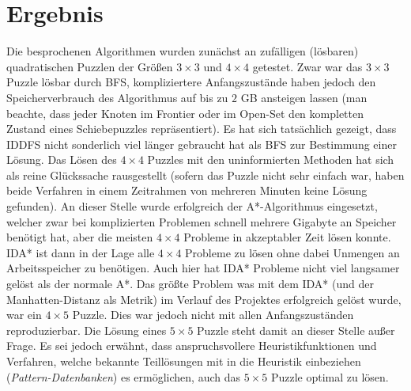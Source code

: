 \documentclass{whswinvcbook}
\begin{document}
\section{Ergebnis}
Die besprochenen Algorithmen wurden zunächst an zufälligen (lösbaren) quadratischen Puzzlen der Größen $3\times3$ und $4\times4$ getestet. Zwar war das $3\times3$ Puzzle lösbar durch BFS, kompliziertere Anfangszustände haben jedoch den Speicherverbrauch des Algorithmus auf bis zu $2$ GB ansteigen lassen (man beachte, dass jeder Knoten im Frontier oder im Open-Set den kompletten Zustand eines Schiebepuzzles repräsentiert). Es hat sich tatsächlich gezeigt, dass IDDFS nicht sonderlich viel länger gebraucht hat als BFS zur Bestimmung einer Lösung. Das Lösen des $4\times4$ Puzzles mit den uninformierten Methoden hat sich als reine Glückssache rausgestellt (sofern das Puzzle nicht sehr einfach war, haben beide Verfahren in einem Zeitrahmen von mehreren Minuten keine Lösung gefunden). An dieser Stelle wurde erfolgreich der A*-Algorithmus eingesetzt, welcher zwar bei komplizierten Problemen schnell mehrere Gigabyte an Speicher benötigt hat, aber die meisten $4\times4$ Probleme in akzeptabler Zeit lösen konnte. IDA* ist dann in der Lage alle $4\times4$ Probleme zu lösen ohne dabei Unmengen an Arbeitsspeicher zu benötigen. Auch hier hat IDA* Probleme nicht viel langsamer gelöst als der normale A*. Das größte Problem was mit dem IDA* (und der Manhatten-Distanz als Metrik) im Verlauf des Projektes erfolgreich gelöst wurde, war ein $4\times5$ Puzzle. Dies war jedoch nicht mit allen Anfangszuständen reproduzierbar. Die Lösung eines $5\times5$ Puzzle steht damit an dieser Stelle außer Frage. Es sei jedoch erwähnt, dass anspruchsvollere Heuristikfunktionen und Verfahren, welche bekannte Teillösungen mit in die Heuristik einbeziehen (\textit{Pattern-Datenbanken}) es ermöglichen, auch das $5\times5$ Puzzle optimal zu lösen.\cite{korf}
\end{document}
